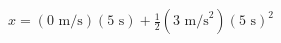 \documentclass[preview]{standalone}
\begin{document}
\begin{align*}
x = (0 \text{ m/s})(5 \text{ s}) + \frac{1}{2}(3 \text{ m/s}^2)(5 \text{ s})^2
\end{align*}
\end{document}
